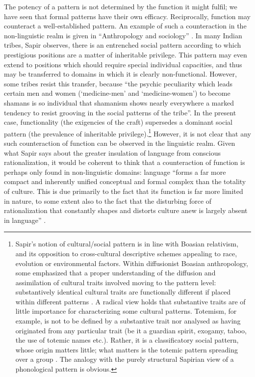 \documentclass[output=paper]{langscibook}
\begin{document}
The potency of a pattern is not determined by the function it might fulfil; we have seen that formal patterns have their own efficacy. Reciprocally, function may counteract a well-established pattern. An example of such a counteraction in the non-linguistic realm is given in ``Anthropology and sociology'' \citep{Sapir1927a}. In many Indian tribes, Sapir observes, there is an entrenched social pattern according to which prestigious positions are a matter of inheritable privilege. This pattern may even extend to positions which should require special individual capacities, and thus may be transferred to domains in which it is clearly non-functional. However, some tribes resist this transfer, because ``the psychic peculiarity which leads certain men and women (`medicine-men' and `medicine-women') to become shamans is so individual that shamanism shows nearly everywhere a marked tendency to resist grooving in the social patterns of the tribe''. In the present case, functionality (the exigencies of the craft) supersedes a dominant social pattern (the prevalence of inheritable privilege).\footnote{Sapir's notion of cultural/social pattern is in line with Boasian relativism, and its opposition to cross-cultural descriptive schemes appealing to race, evolution or environmental factors. Within diffusionist Boasian anthropology, some emphasized that a proper understanding of the diffusion and assimilation of cultural traits involved moving to the pattern level: substantively identical cultural traits are functionally different if placed within different patterns \citep{Wissler1917}. A radical view holds that substantive traits are of little importance for characterizing some cultural patterns. Totemism, for example, is not to be defined by a substantive trait nor analysed as having originated from any particular trait (be it a guardian spirit, exogamy, taboo, the use of totemic names etc.). Rather, it is a classificatory social pattern, whose origin matters little; what matters is the totemic pattern spreading over a group \citep{Goldenweiser1912}. The analogy with the purely structural Sapirian view of a phonological pattern is obvious.} However, it is not clear that any such counteraction of function can be observed in the linguistic realm. Given what Sapir says about the greater insulation of language from conscious rationalization, it would be coherent to think that a counteraction of function is perhaps only found in non-linguistic domains: language ``forms a far more compact and inherently unified conceptual and formal complex than the totality of culture. This is due primarily to the fact that its function is far more limited in nature, to some extent also to the fact that the disturbing force of rationalization that constantly shapes and distorts culture anew is largely absent in language'' \citep[432--433]{Sapir1916}. 
\end{document}
